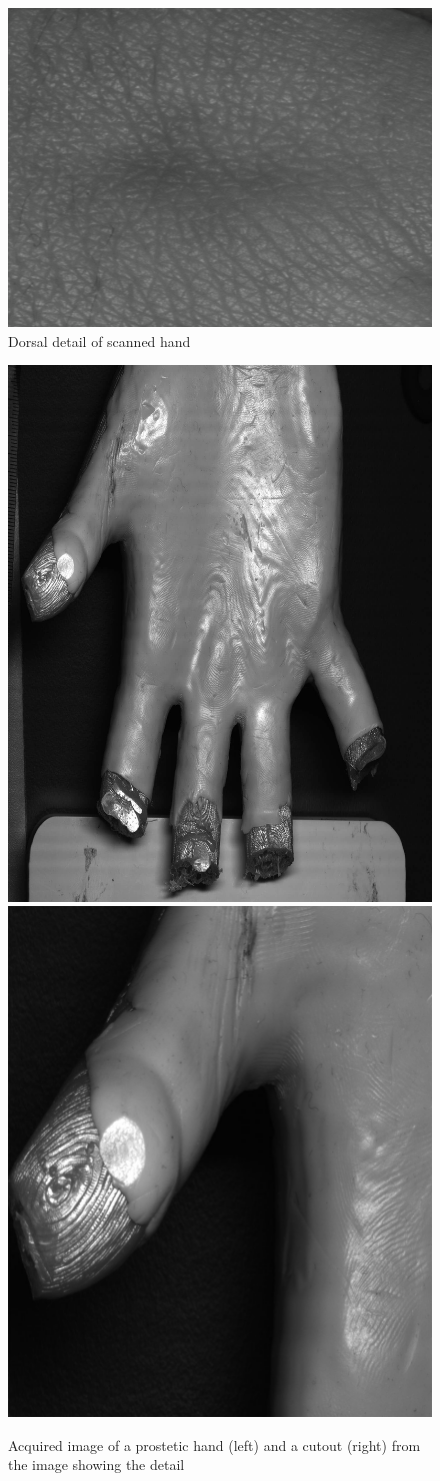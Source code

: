 \documentclass[11pt,a4paper]{article}
\begin{document}

\begin{figure}[ht!]
    \label{fig:hand-detail}
    \centering
    \includegraphics[width=0.5\linewidth]{hand-detail.jpg}
    \caption{Dorsal detail of scanned hand}
\end{figure}

\begin{figure}[ht!]
    \label{fig:prostetic-detail}
    \centering
    \includegraphics[width=0.425\linewidth]{prostetic.jpg}
    \includegraphics[width=0.45\linewidth]{prostetic-detail.jpg}
    \caption{Acquired image of a prostetic hand (left) and a cutout (right) from the image showing the detail}
\end{figure}
\end{document}

